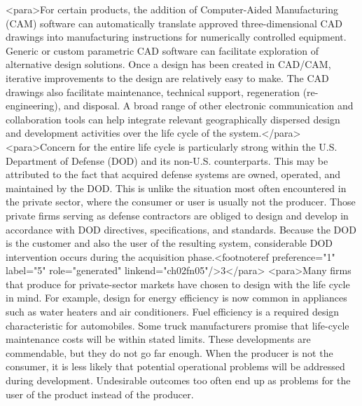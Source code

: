 <para>For certain products, the addition of Computer-Aided Manufacturing (CAM) software can automatically translate approved three-dimensional CAD drawings into manufacturing instructions for numerically controlled equipment. Generic or custom parametric CAD software can facilitate exploration of alternative design solutions. Once a design has been created in CAD/CAM, iterative improvements to the design are relatively easy to make. The CAD drawings also facilitate maintenance, technical support, regeneration (re-engineering), and disposal. A broad range of other electronic communication and collaboration tools can help integrate relevant geographically dispersed design and development activities over the life cycle of the system.</para>
<para>Concern for the entire life cycle is particularly strong within the U.S. Department of Defense (DOD) and its non-U.S. counterparts. This may be attributed to the fact that acquired defense systems are owned, operated, and maintained by the DOD. This is unlike the situation most often encountered in the private sector, where the consumer or user is usually not the producer. Those private firms serving as defense contractors are obliged to design and develop in accordance with DOD directives, specifications, and standards. Because the DOD is the customer and also the user of the resulting system, considerable DOD intervention occurs during the acquisition phase.<footnoteref preference="1" label="5" role="generated" linkend="ch02fn05"/>3</para>
<para>Many firms that produce for private-sector markets have chosen to design with the life cycle in mind. For example, design for energy efficiency is now common in appliances such as water heaters and air conditioners. Fuel efficiency is a required design characteristic for automobiles. Some truck manufacturers promise that life-cycle maintenance costs will be within stated limits. These developments are commendable, but they do not go far enough. When the producer is not the consumer, it is less likely that potential operational problems will be addressed during development. Undesirable outcomes too often end up as problems for the user of the product instead of the producer.
